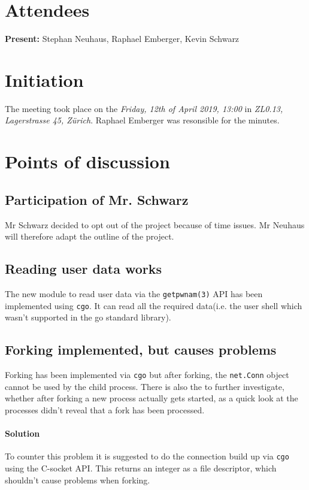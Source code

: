 \documentclass[10pt,a4paper,twoside,english,minutes]{zhawreprt}
\begin{document}
\maketitle

\section{Attendees}\label{sec:Attandees}
\textbf{Present:} Stephan Neuhaus, Raphael Emberger, Kevin Schwarz

\section{Initiation}\label{sec:Initiation}
The meeting took place on the \textit{Friday, 12th of April 2019, 13:00} in \textit{ZL0.13, Lagerstrasse 45, Zürich}. Raphael Emberger was resonsible for the minutes.

\section{Points of discussion}
\subsection{Participation of Mr. Schwarz}
Mr Schwarz decided to opt out of the project because of time issues. Mr Neuhaus will therefore adapt the outline of the project.

\subsection{Reading user data works}
The new module to read user data via the \texttt{getpwnam(3)} API has been implemented using \texttt{cgo}. It can read all the required data(i.e. the user shell which wasn't supported in the go standard library).

\subsection{Forking implemented, but causes problems}
Forking has been implemented via \texttt{cgo} but after forking, the \texttt{net.Conn} object cannot be used by the child process. There is also the to further investigate, whether after forking a new process actually gets started, as a quick look at the processes didn't reveal that a fork has been processed.
\paragraph{Solution}
To counter this problem it is suggested to do the connection build up via \texttt{cgo} using the C-socket API. This returns an integer as a file descriptor, which shouldn't cause problems when forking.
\end{document}

